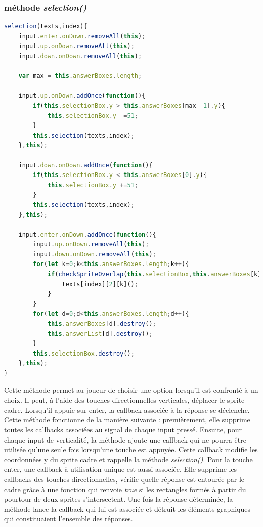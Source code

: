 \documentclass[11pt]{article}
\begin{document}
\begin{appendices}
\subsubsection{méthode \textit{selection()}}
\begin{lstlisting}[language=JavaScript]
selection(texts,index){
    input.enter.onDown.removeAll(this);
    input.up.onDown.removeAll(this);
    input.down.onDown.removeAll(this);
    
    var max = this.answerBoxes.length;
    
    input.up.onDown.addOnce(function(){
        if(this.selectionBox.y > this.answerBoxes[max -1].y){
            this.selectionBox.y -=51;
        }
        this.selection(texts,index);
    },this);
    
    input.down.onDown.addOnce(function(){
        if(this.selectionBox.y < this.answerBoxes[0].y){
            this.selectionBox.y +=51;
        }
        this.selection(texts,index);
    },this);
    
    input.enter.onDown.addOnce(function(){
        input.up.onDown.removeAll(this);
        input.down.onDown.removeAll(this);
        for(let k=0;k<this.answerBoxes.length;k++){
            if(checkSpriteOverlap(this.selectionBox,this.answerBoxes[k])){
                texts[index][2][k]();
            }
        }
        for(let d=0;d<this.answerBoxes.length;d++){
            this.answerBoxes[d].destroy();
            this.answerList[d].destroy();
        }
        this.selectionBox.destroy();
    },this);
}
\end{lstlisting} 
Cette méthode permet au joueur de choisir une option lorsqu'il est confronté à un choix. Il peut, à l'aide des touches directionnelles verticales,  déplacer le sprite cadre. Lorsqu'il appuie sur enter, la callback associée à la réponse se déclenche. \\

Cette méthode fonctionne  de la manière suivante : premièrement, elle supprime toutes les callbacks associées au signal de chaque input pressé. Ensuite, pour chaque input de verticalité, la méthode ajoute une callback qui ne pourra être utilisée qu'une seule fois lorsqu'une touche est appuyée. Cette callback modifie les coordonnées y du sprite cadre et rappelle la méthode \textit{selection()}. Pour la touche enter, une callback à utilisation unique est aussi associée. Elle supprime les callbacks des touches directionnelles, vérifie quelle réponse est entourée par le cadre grâce à une fonction qui renvoie \textit{true} si les rectangles formés à partir du pourtour de deux sprites s'intersectent. Une fois la réponse déterminée, la méthode lance la callback qui lui est associée et détruit les éléments graphiques qui constituaient l'ensemble des réponses.

\end{appendices}
\end{document}
